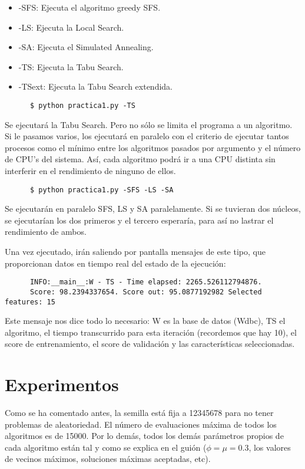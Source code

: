 \documentclass[a4paper, 11pt]{article}
\begin{document}
    \begin{itemize}
      \item -SFS: Ejecuta el algoritmo greedy SFS.
      \item -LS: Ejecuta la Local Search.
      \item -SA: Ejecuta el Simulated Annealing.
      \item -TS: Ejecuta la Tabu Search.
      \item -TSext: Ejecuta la Tabu Search extendida.
    \end{itemize}

    \begin{verbatim}
      $ python practica1.py -TS
    \end{verbatim}
    Se ejecutará la Tabu Search. Pero no sólo se limita el programa a un algoritmo. Si le pasamos varios, los ejecutará en paralelo con el criterio de ejecutar tantos procesos como el mínimo entre los algoritmos pasados por argumento y el número de CPU's del sistema. Así, cada algoritmo podrá ir a una CPU distinta sin interferir en el rendimiento de ninguno de ellos.

    \begin{verbatim}
      $ python practica1.py -SFS -LS -SA
    \end{verbatim}
    Se ejecutarán en paralelo SFS, LS y SA paralelamente. Si se tuvieran dos núcleos, se ejecutarían los dos primeros y el tercero esperaría, para así no lastrar el rendimiento de ambos.

    Una vez ejecutado, irán saliendo por pantalla mensajes de este tipo, que proporcionan datos en tiempo real del estado de la ejecución:

    \begin{verbatim}
      INFO:__main__:W - TS - Time elapsed: 2265.526112794876.
      Score: 98.2394337654. Score out: 95.0877192982 Selected features: 15
    \end{verbatim}

    Este mensaje nos dice todo lo necesario: W es la base de datos (Wdbc), TS el algoritmo, el tiempo transcurrido para esta iteración (recordemos que hay 10), el score de entrenamiento, el score de validación y las características seleccionadas.
  \section{Experimentos}
    Como se ha comentado antes, la semilla está fija a 12345678 para no tener problemas de aleatoriedad. El número de evaluaciones máxima de todos los algoritmos es de 15000. Por lo demás, todos los demás parámetros propios de cada algoritmo están tal y como se explica en el guión ($\phi=\mu=0.3$, los valores de vecinos máximos, soluciones máximas aceptadas, etc). \\
\end{document}
